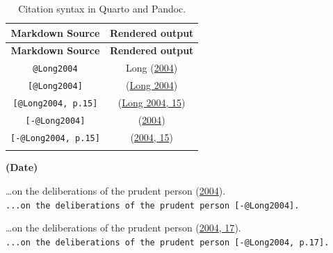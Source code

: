 \documentclass[
  12pt,
  a4paper,
  oneside,
  titlepage,
  toclink=all,
  toc=bibliography]{scrbook}
\theoremstyle{definition}
\theoremstyle{plain}
\theoremstyle{plain}
\theoremstyle{plain}
\theoremstyle{plain}
\theoremstyle{definition}
\theoremstyle{definition}
\theoremstyle{plain}
\theoremstyle{remark}
\begin{document}
\hypertarget{tbl-scriv43}{}
\begin{longtable}[]{@{}cc@{}}
\toprule\noalign{}
\textbf{Markdown Source} & \textbf{Rendered output} \\
\midrule\noalign{}
\endfirsthead
\toprule\noalign{}
\textbf{Markdown Source} & \textbf{Rendered output} \\
\midrule\noalign{}
\endhead
\bottomrule\noalign{}
\endlastfoot
\texttt{@Long2004} & \protect\hypertarget{cite_80}{}{\label{cite_80}Long
(\protect\hyperlink{ref-Long2004}{2004})} \\
\texttt{{[}@Long2004{]}} &
\protect\hypertarget{cite_81}{}{\label{cite_81}(\protect\hyperlink{ref-Long2004}{Long
2004})} \\
\texttt{{[}@Long2004,\ p.15{]}} &
\protect\hypertarget{cite_82}{}{\label{cite_82}(\protect\hyperlink{ref-Long2004}{Long
2004, 15})} \\
\texttt{{[}-@Long2004{]}} &
\protect\hypertarget{cite_83}{}{\label{cite_83}(\protect\hyperlink{ref-Long2004}{2004})} \\
\texttt{{[}-@Long2004,\ p.15{]}} &
\protect\hypertarget{cite_84}{}{\label{cite_84}(\protect\hyperlink{ref-Long2004}{2004,
15})} \\
\caption{\label{tbl-scriv43}Citation syntax in Quarto and
Pandoc.}\tabularnewline
\end{longtable}

\begin{tcolorbox}[enhanced jigsaw, left=2mm, colframe=quarto-callout-note-color-frame, colback=white, opacityback=0, breakable, toprule=.15mm, arc=.35mm, rightrule=.15mm, bottomrule=.15mm, leftrule=.75mm]
\begin{minipage}[t]{5.5mm}
\textcolor{quarto-callout-note-color}{\faInfo}
\end{minipage}%
\begin{minipage}[t]{\textwidth - 5.5mm}

\textbf{(Date)}\vspace{2mm}

\ldots on the deliberations of the prudent person
\protect\hypertarget{cite_85}{}{\label{cite_85}(\protect\hyperlink{ref-Long2004}{2004})}.
\texttt{...on\ the\ deliberations\ of\ the\ prudent\ person\ {[}-@Long2004{]}.}

\ldots on the deliberations of the prudent person
\protect\hypertarget{cite_86}{}{\label{cite_86}(\protect\hyperlink{ref-Long2004}{2004,
17})}.
\texttt{...on\ the\ deliberations\ of\ the\ prudent\ person\ {[}-@Long2004,\ p.17{]}.}

\end{minipage}%
\end{tcolorbox}
\end{document}
